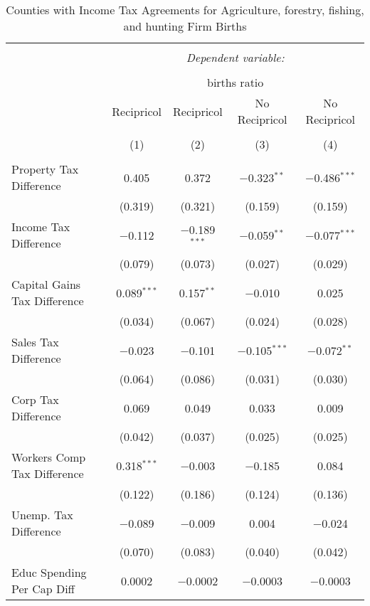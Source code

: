 
\begin{table}[!htbp] \centering 
  \caption{Counties with Income Tax Agreements for  Agriculture, forestry, fishing, and hunting Firm Births} 
  \label{11rd} 
\begin{tabular}{@{\extracolsep{5pt}}lcccc} 
\\[-1.8ex]\hline 
\hline \\[-1.8ex] 
 & \multicolumn{4}{c}{\textit{Dependent variable:}} \\ 
\cline{2-5} 
\\[-1.8ex] & \multicolumn{4}{c}{births ratio} \\ 
 & Recipricol & Recipricol & No Recipricol & No Recipricol \\ 
\\[-1.8ex] & (1) & (2) & (3) & (4)\\ 
\hline \\[-1.8ex] 
 Property Tax Difference & 0.405 & 0.372 & $-$0.323$^{**}$ & $-$0.486$^{***}$ \\ 
  & (0.319) & (0.321) & (0.159) & (0.159) \\ 
  Income Tax Difference & $-$0.112 & $-$0.189$^{***}$ & $-$0.059$^{**}$ & $-$0.077$^{***}$ \\ 
  & (0.079) & (0.073) & (0.027) & (0.029) \\ 
  Capital Gains Tax Difference & 0.089$^{***}$ & 0.157$^{**}$ & $-$0.010 & 0.025 \\ 
  & (0.034) & (0.067) & (0.024) & (0.028) \\ 
  Sales Tax Difference & $-$0.023 & $-$0.101 & $-$0.105$^{***}$ & $-$0.072$^{**}$ \\ 
  & (0.064) & (0.086) & (0.031) & (0.030) \\ 
  Corp Tax Difference & 0.069 & 0.049 & 0.033 & 0.009 \\ 
  & (0.042) & (0.037) & (0.025) & (0.025) \\ 
  Workers Comp Tax Difference & 0.318$^{***}$ & $-$0.003 & $-$0.185 & 0.084 \\ 
  & (0.122) & (0.186) & (0.124) & (0.136) \\ 
  Unemp. Tax Difference & $-$0.089 & $-$0.009 & 0.004 & $-$0.024 \\ 
  & (0.070) & (0.083) & (0.040) & (0.042) \\ 
  Educ Spending Per Cap Diff & 0.0002 & $-$0.0002 & $-$0.0003 & $-$0.0003 \\ 

\end{tabular}
\end{table}
